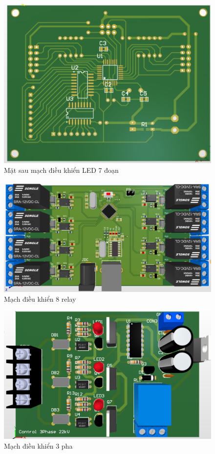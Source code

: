             \begin{figure}[H]
                \centering
                \includegraphics[width=1\textwidth]{pictures/pcb2.png}
                \caption{Mặt sau mạch điều khiển LED 7 đoạn}
                \label{fig:hbridge}
            \end{figure}
            \begin{figure}[H]
                \centering
                \includegraphics[width=1\textwidth]{pictures/pcb3.png}
                \caption{Mạch điều khiển 8 relay}
                \label{fig:hbridge}
            \end{figure}
            \begin{figure}[H]
                \centering
                \includegraphics[width=1\textwidth]{pictures/pcb4.png}
                \caption{Mạch điều khiển 3 pha}
                \label{fig:hbridge}
            \end{figure}
